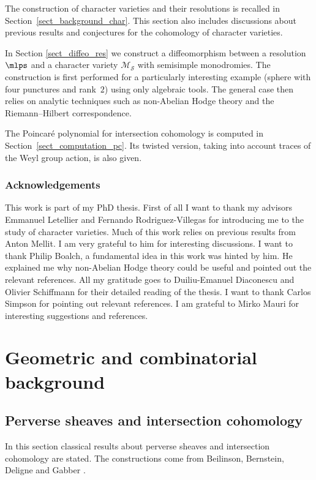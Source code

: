 The construction of character varieties and their resolutions is recalled in Section~\ref{sect_background_char}. This section also includes discussions about previous results and conjectures for the cohomology of character varieties.

In Section \ref{sect_diffeo_res} we construct a diffeomorphism between a resolution $\mlps$ and a character variety $\mathcal{M}_{\boldsymbol{\mathcal{S}}}$ with semisimple monodromies. The construction is first performed for a particularly interesting example (sphere with four punctures and rank~$2$) using only algebraic tools. The general case then relies on analytic techniques such as non-Abelian Hodge theory and the Riemann--Hilbert correspondence.

The Poincaré polynomial for intersection cohomology is computed in Section~\ref{sect_computation_pc}. Its twisted version, taking into account traces of the Weyl group action, is also given.

\subsubsection*{Acknowledgements}

This work is part of my PhD thesis. First of all I want to thank my advisors Emmanuel Letellier and Fernando Rodriguez-Villegas for introducing me to the study of character varieties. Much of this work relies on previous results from Anton Mellit. I am very grateful to him for interesting discussions. I want to thank Philip Boalch, a fundamental idea in this work was hinted by him. He explained me why non-Abelian Hodge theory could be useful and pointed out the relevant references. All my gratitude goes to Duiliu-Emanuel Diaconescu and Olivier Schiffmann for their detailed reading of the thesis. I want to thank Carlos Simpson for pointing out relevant references. I am grateful to Mirko Mauri for interesting suggestions and references.

\section{Geometric and combinatorial background}\label{sect_background}
\subsection{Perverse sheaves and intersection cohomology}\label{sect_perv_ic}
In this section classical results about perverse sheaves and intersection cohomology are stated. The constructions come from Beilinson, Bernstein, Deligne and Gabber \cite{Beilinson_Bernstein_Deligne_Gabber}.

